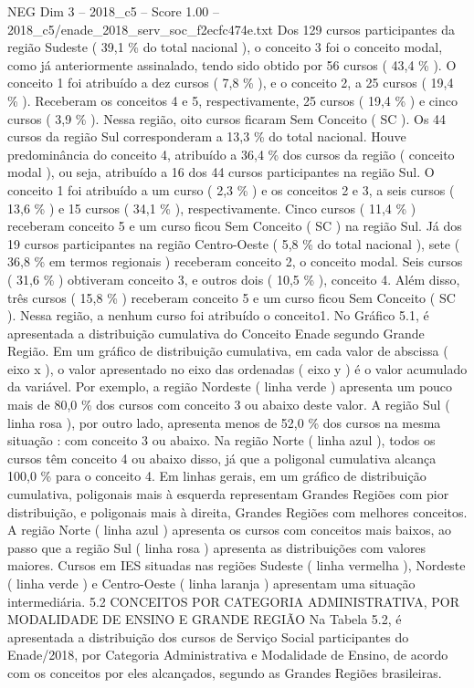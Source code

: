 \begin{textsample}{NEG Dim 3 – 2018\_c5 – Score 1.00 – 2018\_c5/enade\_2018\_serv\_soc\_f2ecfc474e.txt}
Dos 129 cursos participantes da região Sudeste ( 39,1 \% do total nacional ), o conceito 3 foi o conceito modal, como já anteriormente assinalado, tendo sido obtido por 56 cursos ( 43,4 \% ).
O conceito 1 foi atribuído a dez cursos ( 7,8 \% ), e o conceito 2, a 25 cursos ( 19,4 \% ).
Receberam os conceitos 4 e 5, respectivamente, 25 cursos ( 19,4 \% ) e cinco cursos ( 3,9 \% ).
Nessa região, oito cursos ficaram Sem Conceito ( SC ).
Os 44 cursos da região Sul corresponderam a 13,3 \% do total nacional.
Houve predominância do conceito 4, atribuído a 36,4 \% dos cursos da região ( conceito modal ), ou seja, atribuído a 16 dos 44 cursos participantes na região Sul.
O conceito 1 foi atribuído a um curso ( 2,3 \% ) e os conceitos 2 e 3, a seis cursos ( 13,6 \% ) e 15 cursos ( 34,1 \% ), respectivamente.
Cinco cursos ( 11,4 \% ) receberam conceito 5 e um curso ficou Sem Conceito ( SC ) na região Sul.
Já dos 19 cursos participantes na região Centro-Oeste ( 5,8 \% do total nacional ), sete ( 36,8 \% em termos regionais ) receberam conceito 2, o conceito modal.
Seis cursos ( 31,6 \% ) obtiveram conceito 3, e outros dois ( 10,5 \% ), conceito 4.
Além disso, três cursos ( 15,8 \% ) receberam conceito 5 e um curso ficou Sem Conceito ( SC ).
Nessa região, a nenhum curso foi atribuído o conceito1.
No Gráfico 5.1, é apresentada a distribuição cumulativa do Conceito Enade segundo Grande Região.
Em um gráfico de distribuição cumulativa, em cada valor de abscissa ( eixo x ), o valor apresentado no eixo das ordenadas ( eixo y ) é o valor acumulado da variável.
Por exemplo, a região Nordeste ( linha verde ) apresenta um pouco mais de 80,0 \% dos cursos com conceito 3 ou abaixo deste valor.
A região Sul ( linha rosa ), por outro lado, apresenta menos de 52,0 \% dos cursos na mesma situação : com conceito 3 ou abaixo.
Na região Norte ( linha azul ), todos os cursos têm conceito 4 ou abaixo disso, já que a poligonal cumulativa alcança 100,0 \% para o conceito 4.
Em linhas gerais, em um gráfico de distribuição cumulativa, poligonais mais à esquerda representam Grandes Regiões com pior distribuição, e poligonais mais à direita, Grandes Regiões com melhores conceitos.
A região Norte ( linha azul ) apresenta os cursos com conceitos mais baixos, ao passo que a região Sul ( linha rosa ) apresenta as distribuições com valores maiores.
Cursos em IES situadas nas regiões Sudeste ( linha vermelha ), Nordeste ( linha verde ) e Centro-Oeste ( linha laranja ) apresentam uma situação intermediária. 5.2 CONCEITOS POR CATEGORIA ADMINISTRATIVA, POR MODALIDADE DE ENSINO E GRANDE REGIÃO Na Tabela 5.2, é apresentada a distribuição dos cursos de Serviço Social participantes do Enade/2018, por Categoria Administrativa e Modalidade de Ensino, de acordo com os conceitos por eles alcançados, segundo as Grandes Regiões brasileiras.

\end{textsample}
